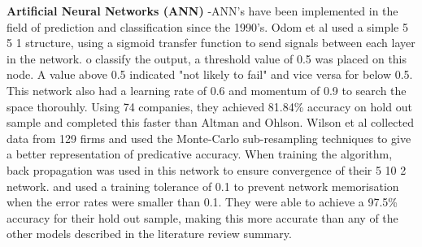 \documentclass[11pt]{article}
\begin{document}
\textbf{Artificial Neural Networks (ANN)} -ANN's have been implemented in the field of prediction and classification since the 1990's. Odom et al used a simple 5 5 1 structure, using a sigmoid transfer function to send signals between each layer in the network. o classify the output, a threshold value of 0.5 was placed on this node. A value above 0.5 indicated "not likely to fail" and vice versa for below 0.5. This network also had a learning rate of 0.6 and momentum of 0.9 to search the space thorouhly. Using 74 companies, they achieved 81.84\% accuracy on hold out sample and completed this faster than Altman and Ohlson. Wilson et al collected data from 129 firms and used the Monte-Carlo  sub-resampling techniques to give a better representation of predicative accuracy. When training the algorithm, back propagation was used in this network to ensure convergence of their 5 10 2 network. and used a training tolerance of 0.1 to prevent network memorisation when the error rates were smaller than 0.1. They were able to achieve a 97.5\% accuracy for their hold out sample, making this more accurate than any of the other models described in the literature review summary. 
\end{document}

